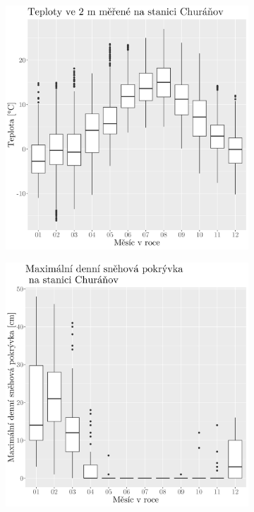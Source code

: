 \begin{figure}
	\centering
	\begin{subfigure}{0.45\textwidth}
  \includegraphics[width=\textwidth]{img/synop_temperature.png}
		\caption{}
		\label{fig:synop_temperature}
	\end{subfigure}
	\hfill
	\begin{subfigure}{0.45\textwidth}
  \includegraphics[width=\textwidth]{img/synop_snowcm.png}

\end{subfigure}
\end{figure}
